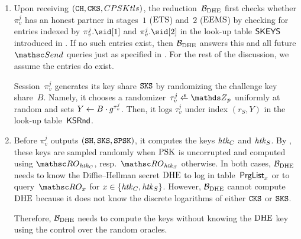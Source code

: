 	\begin{enumerate}
		\item Upon receiving $(\mathtt{CH}, \mathtt{CKS}, \\CPSKtls)$, the reduction~$\mathcal{B}_{\mathrm{DHE}}$ first checks whether $\pi_v^j$ has an honest partner in stages~$1$ ($\mathrm{ETS}$) and~$2$ ($\mathrm{EEMS}$) by checking for entries indexed by $\pi_v^j.\sid[1]$ and $\pi_v^j.\sid[2]$ in the look-up table $\mathsf{SKEYS}$ introduced in .
		If no such entries exist, then $\mathcal{B}_{\mathrm{DHE}}$ answers this and all future $\Send$ queries just as specified in \thisGame.
		For the rest of the discussion, we assume the entries do exist.
		
		Session~$\pi_v^j$ generates its key share $\mathtt{SKS}$ by randomizing the challenge key share~$B$. 
		Namely, it chooses  a randomizer~$\tau_v^j \sample \Z_p$ uniformly at random and sets $Y \gets B \cdot g^{\tau_v^j}$.
		Then, it logs $\tau_v^j$ under index $(r_S, Y)$ in the look-up table~$\mathsf{KSRnd}$.
		\item Before $\pi_v^j$ outputs $(\mathtt{SH},\mathtt{SKS}, \mathtt{SPSK})$, it computes the keys $\mathit{htk}_C$ and $\mathit{htk}_S$.
		By , these keys are sampled randomly when $\mathrm{PSK}$ is uncorrupted and computed using $\RO_{\chtk}$, resp.\ $\RO_{\shtk}$ otherwise.
		In both cases, $\mathcal{B}_{\mathrm{DHE}}$ needs to know the Diffie--Hellman secret $\mathrm{DHE}$ to log in table~$\mathsf{PrgList}_x$ or to query~$\RO_x$ for $x \in \{\mathit{htk}_C, \mathit{htk}_S\}$.
		However, $\mathcal{B}_{\mathrm{DHE}}$ cannot compute $\mathrm{DHE}$ because it does not know the discrete logarithms of either $\mathtt{CKS}$ or $\mathtt{SKS}$.
		
		Therefore, $\mathcal{B}_{\mathrm{DHE}}$ needs to compute the keys without knowing the $\mathrm{DHE}$ key using the control over the random oracles.
		

\end{enumerate}
